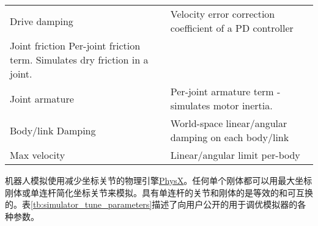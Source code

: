 \begin{table}
\begin{threeparttable}[c]
\begin{tabular}{C{4cm} C{10cm}}
      Drive damping & Velocity error correction coefficient of a PD controller\\
      Joint friction Per-joint friction term. Simulates dry friction in a joint.\\
      Joint armature & Per-joint armature term - simulates motor inertia.\\
      Body/link Damping & World-space linear/angular damping on each body/link\\
      Max velocity & Linear/angular limit per-body\\
      \bottomrule
    \end{tabular}
  \end{threeparttable}
\end{table}

机器人模拟使用减少坐标关节的物理引擎\href{https://developer.nvidia.com/physx-sdk}{PhysX}。任何单个刚体都可以用最大坐标刚体或单连杆简化坐标关节来模拟。具有单连杆的关节和刚体的是等效的和可互换的。表\ref{tb:simulator_tune_parameters}描述了向用户公开的用于调优模拟器的各种参数。














